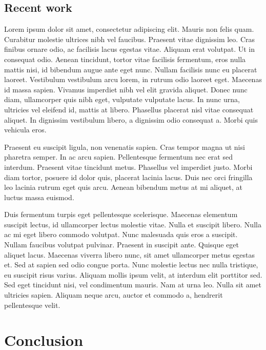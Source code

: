 \documentclass[english]{tktltiki}
\begin{document}
\subsection{Recent work}


Lorem ipsum dolor sit amet, consectetur adipiscing elit. Mauris non felis quam. Curabitur molestie ultrices nibh vel faucibus. Praesent vitae dignissim leo. Cras finibus ornare odio, ac facilisis lacus egestas vitae. Aliquam erat volutpat. Ut in consequat odio. Aenean tincidunt, tortor vitae facilisis fermentum, eros nulla mattis nisi, id bibendum augue ante eget nunc. Nullam facilisis nunc eu placerat laoreet. Vestibulum vestibulum arcu lorem, in rutrum odio laoreet eget. Maecenas id massa sapien. Vivamus imperdiet nibh vel elit gravida aliquet. Donec nunc diam, ullamcorper quis nibh eget, vulputate vulputate lacus. In nunc urna, ultricies vel eleifend id, mattis at libero. Phasellus placerat nisl vitae consequat aliquet. In dignissim vestibulum libero, a dignissim odio consequat a. Morbi quis vehicula eros.

Praesent eu suscipit ligula, non venenatis sapien. Cras tempor magna ut nisi pharetra semper. In ac arcu sapien. Pellentesque fermentum nec erat sed interdum. Praesent vitae tincidunt metus. Phasellus vel imperdiet justo. Morbi diam tortor, posuere id dolor quis, placerat lacinia lacus. Duis nec orci fringilla leo lacinia rutrum eget quis arcu. Aenean bibendum metus at mi aliquet, at luctus massa euismod.

Duis fermentum turpis eget pellentesque scelerisque. Maecenas elementum suscipit lectus, id ullamcorper lectus molestie vitae. Nulla et suscipit libero. Nulla ac mi eget libero commodo volutpat. Nunc malesuada quis eros a suscipit. Nullam faucibus volutpat pulvinar. Praesent in suscipit ante. Quisque eget aliquet lacus. Maecenas viverra libero nunc, sit amet ullamcorper metus egestas et. Sed at sapien sed odio congue porta. Nunc molestie lectus nec nulla tristique, eu suscipit risus varius. Aliquam mollis ipsum velit, at interdum elit porttitor sed. Sed eget tincidunt nisi, vel condimentum mauris. Nam at urna leo. Nulla sit amet ultricies sapien. Aliquam neque arcu, auctor et commodo a, hendrerit pellentesque velit.

\pagebreak

\section{Conclusion}
\end{document}

